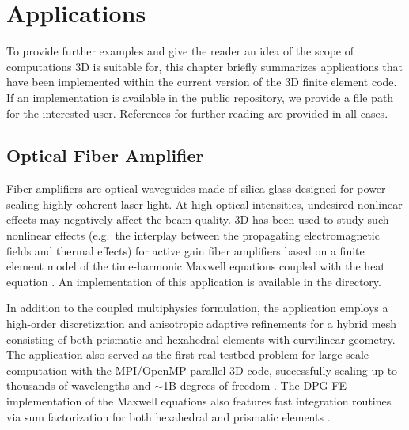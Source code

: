%
%

\chapter{Applications}
\label{chap:applications}


To provide further examples and give the reader an idea of the scope of computations \hp3D is suitable for, this chapter briefly summarizes applications that have been implemented within the current version of the \hp3D finite element code. If an implementation is available in the public repository, we provide a file path for the interested user. References for further reading are provided in all cases.

\section{Optical Fiber Amplifier}
\label{sec:laser}

Fiber amplifiers are optical waveguides made of silica glass designed for power-scaling highly-coherent laser light. At high optical intensities, undesired nonlinear effects may negatively affect the beam quality. \hp3D has been used to study such nonlinear effects (e.g.~the interplay between the propagating electromagnetic fields and thermal effects) for active gain fiber amplifiers based on a finite element model of the time-harmonic Maxwell equations coupled with the heat equation \cite{henneking2021fiber,nagaraj2018raman}. An implementation of this application is available in the  directory. 

In addition to the coupled multiphysics formulation, the application employs a high-order discretization and anisotropic adaptive refinements \cite{henneking2021pollution} for a hybrid mesh consisting of both prismatic and hexahedral elements with curvilinear geometry. The application also served as the first real testbed problem for large-scale computation with the MPI/OpenMP parallel \hp3D code, successfully scaling up to thousands of wavelengths and $\sim$1B degrees of freedom \cite{henneking2021phd,henneking2022parallel}. The DPG FE implementation of the Maxwell equations also features fast integration routines via sum factorization for both hexahedral and prismatic elements \cite{mora2019fast,badger2020fast}.

